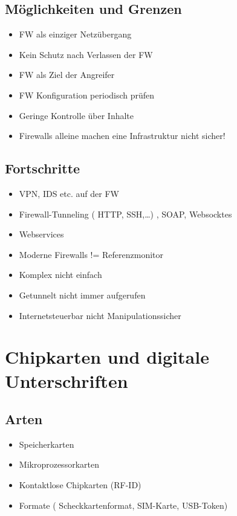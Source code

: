 \subsection*{ Möglichkeiten und Grenzen }
\begin{itemize}
	\item FW als einziger Netzübergang 
	\item Kein Schutz nach Verlassen der FW
	\item FW als Ziel der Angreifer
	\item FW Konfiguration periodisch prüfen
	\item Geringe Kontrolle über Inhalte
	\item Firewalls alleine machen eine Infrastruktur nicht sicher!
\end{itemize}


\subsection*{  Fortschritte }
\begin{itemize}
	\item VPN, IDS etc. auf der FW
	\item Firewall-Tunneling ( HTTP, SSH,…) , SOAP, Websocktes
	\item Webservices
	\item Moderne Firewalls != Referenzmonitor
	\item Komplex nicht einfach
	\item Getunnelt nicht immer aufgerufen
	\item Internetsteuerbar nicht Manipulationssicher
\end{itemize}



\section*{Chipkarten und digitale Unterschriften}

\subsection*{  Arten }
\begin{itemize}
	\item Speicherkarten
	\item Mikroprozessorkarten
	\item Kontaktlose Chipkarten (RF-ID)
	\item Formate ( Scheckkartenformat, SIM-Karte, USB-Token)
\end{itemize}

